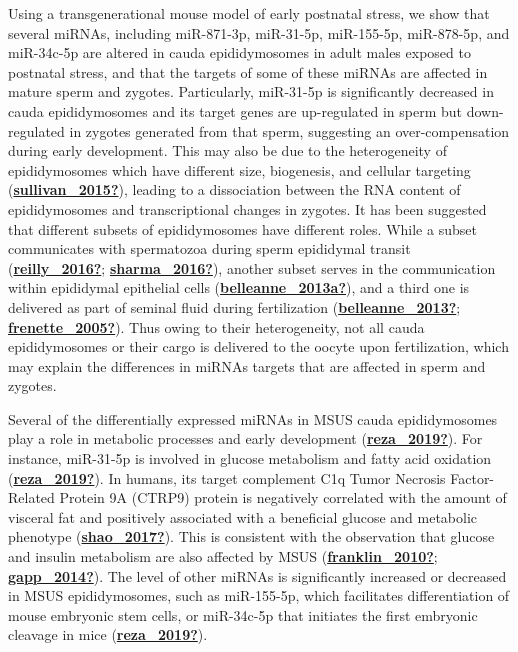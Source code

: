 \documentclass[12pt,twoside]{reedthesis}
\begin{document}
Using a transgenerational mouse model of early postnatal stress, we show
that several miRNAs, including miR-871-3p, miR-31-5p, miR-155-5p,
miR-878-5p, and miR-34c-5p are altered in cauda epididymosomes in adult
males exposed to postnatal stress, and that the targets of some of these
miRNAs are affected in mature sperm and zygotes. Particularly, miR-31-5p
is significantly decreased in cauda epididymosomes and its target genes
are up-regulated in sperm but down-regulated in zygotes generated from
that sperm, suggesting an over-compensation during early development.
This may also be due to the heterogeneity of epididymosomes which have
different size, biogenesis, and cellular targeting (\protect\hyperlink{ref-sullivan_2015}{\textbf{sullivan\_2015?}}),
leading to a dissociation between the RNA content of epididymosomes and
transcriptional changes in zygotes. It has been suggested that different
subsets of epididymosomes have different roles. While a subset
communicates with spermatozoa during sperm epididymal transit
(\protect\hyperlink{ref-reilly_2016}{\textbf{reilly\_2016?}}; \protect\hyperlink{ref-sharma_2016}{\textbf{sharma\_2016?}}), another subset serves in the communication
within epididymal epithelial cells (\protect\hyperlink{ref-belleanne_2013a}{\textbf{belleanne\_2013a?}}), and a third one
is delivered as part of seminal fluid during fertilization
(\protect\hyperlink{ref-belleanne_2013}{\textbf{belleanne\_2013?}}; \protect\hyperlink{ref-frenette_2005}{\textbf{frenette\_2005?}}). Thus owing to their heterogeneity,
not all cauda epididymosomes or their cargo is delivered to the oocyte
upon fertilization, which may explain the differences in miRNAs targets
that are affected in sperm and zygotes.

Several of the differentially expressed miRNAs in MSUS cauda
epididymosomes play a role in metabolic processes and early development
(\protect\hyperlink{ref-reza_2019}{\textbf{reza\_2019?}}). For instance, miR-31-5p is involved in glucose metabolism
and fatty acid oxidation (\protect\hyperlink{ref-reza_2019}{\textbf{reza\_2019?}}). In humans, its target complement
C1q Tumor Necrosis Factor-Related Protein 9A (CTRP9) protein is
negatively correlated with the amount of visceral fat and positively
associated with a beneficial glucose and metabolic phenotype
(\protect\hyperlink{ref-shao_2017}{\textbf{shao\_2017?}}). This is consistent with the observation that glucose and
insulin metabolism are also affected by MSUS (\protect\hyperlink{ref-franklin_2010}{\textbf{franklin\_2010?}}; \protect\hyperlink{ref-gapp_2014}{\textbf{gapp\_2014?}}). The level of other miRNAs is significantly increased or
decreased in MSUS epididymosomes, such as miR-155-5p, which facilitates
differentiation of mouse embryonic stem cells, or miR-34c-5p that
initiates the first embryonic cleavage in mice (\protect\hyperlink{ref-reza_2019}{\textbf{reza\_2019?}}).
\end{document}
